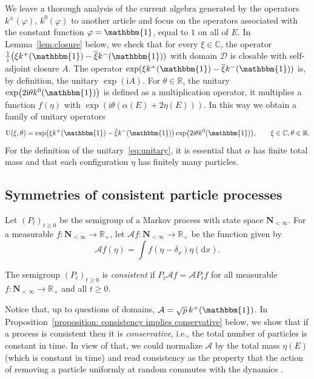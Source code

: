 \documentclass[10pt,a4paper]{amsart}
\numberwithin{equation}{section}
\newcommand{\R}{\mathbb{R}}
\newcommand{\C}{\mathbb{C}}
\newcommand{\dd}{\mathrm{d}} %
\newcommand{\1}{\mathbbm{1}}
\begin{document}
We leave a thorough analysis of the current algebra generated by the operators $k^\pm(\varphi)$, $k^0(\varphi)$ to another article \cite{algebraic_Floreani} and focus on the operators associated with the constant function $\varphi = \1$, equal to $1$ on all of $E$. In Lemma~\ref{lem:closure} below, we check that for every $\xi \in \C$, the operator $\frac{1}{\mathrm i} \bigl( \xi k^+(\1) - \overline{\xi} k^-(\1))$ with domain $\mathcal D$ is closable with self-adjoint closure $A$. The operator $\exp( \xi k^+(\1) - \overline{\xi} k^-(\1))$ is, by definition, the unitary $\exp(\mathrm i A)$.
For $\theta \in \R$, the unitary $\exp\bigl( 2\mathrm i \theta k^0(\1)\bigr)$ is defined as a multiplication operator, it multiplies a function $f(\eta)$ with $\exp(\mathrm i \theta (\alpha (E) + 2 \eta(E)))$.
In this way we obtain a family of unitary operators
\begin{equation}\label{eq:unitary}
	{\rm U}(\xi,\theta) = \exp\bigl( \xi k^+(\1) - \overline{\xi} k^-(\1)\bigr) \exp\bigl(2\mathrm i\theta k^0(\1)\bigr),\qquad \xi \in \C,\theta\in \R.
\end{equation}
For the definition of the unitary~\eqref{eq:unitary}, it is essential that $\alpha$ has finite total mass and that each configuration $\eta$ has finitely many particles.

\subsection{Symmetries of consistent particle processes}

Let $(P_t)_{t\geq 0}$ be the semigroup of a Markov process with state space $\mathbf N_{<\infty}$. For a measurable $f\colon \mathbf N_{<\infty} \to \R_+$, let $\mathcal A f\colon \mathbf N_{<\infty} \to \R_+$ be the function given by
\[
	\mathcal A f(\eta) = \int f(\eta-\delta_x)\eta(\dd x).
\]

\begin{Definition}
 The semigroup $(P_t)_{t\geq 0}$ is \emph{consistent} if $P_t \mathcal A f = \mathcal A P_t f$ for all measurable $f\colon \mathbf N_{<\infty}\to \R_+$ and all $t\geq 0$.
\end{Definition}

Notice that, up to questions of domains, $\mathcal A = \sqrt p\, k^+(\1)$. In Proposition~\ref{proposition: consistency implies conservative} below, we show that if a process is consistent then it is \emph{conservative}, i.e., the total number of particles is constant in time. In view of that, we could normalize $\mathcal A$ by the total mass $\eta(E)$ (which is constant in time) and read consistency as the property that the action of removing a particle uniformly at random commutes with the dynamics \cite{carinci2021consistent,IntertwiningConsistent}.
\end{document}
